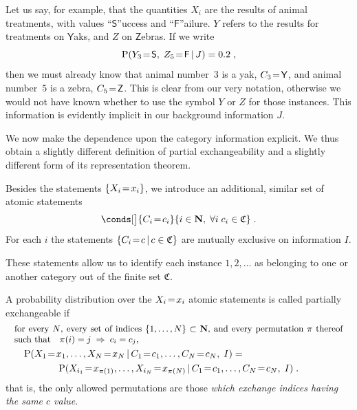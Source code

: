 \documentclass[\ifafour a4paper,12pt,\else a5paper,10pt,\fi%
onecolumn,oneside,article,%
british%
]{memoir}
\theoremstyle{remark}
\theoremstyle{innote}
\newcommand*{\NN}{\bm{\mathrm{N}}}
\DeclarePairedDelimiter\set{\{}{\}}
\newcommand*{\p}{\mathrm{P}}%
\renewcommand*{\|}[1][]{\nonscript\,#1\vert\nonscript\,\mathopen{}}
\newcommand*{\sect}{\S}%
\newcommand*{\mathbox}[2][.8]{\parbox[b]{#1\columnwidth}{#2}}
\renewcommand*{\=}{\TextOrMath\texteq\eq}
\newcommand*{\X}[1]{X_{#1}}
\newcommand*{\x}[1]{x_{#1}}
\newcommand*{\Y}[1]{Y_{#1}}
\newcommand*{\Z}[1]{Z_{#1}}
\newcommand*{\C}[1]{C_{#1}}
\newcommand*{\cc}[1]{c_{#1}}
\newcommand*{\sC}{\mathfrak{C}}
\newcommand*{\xs}{\textsf{S}}
\newcommand*{\xf}{\textsf{F}}
\newcommand*{\xY}{\textsf{Y}}
\newcommand*{\xZ}{\textsf{Z}}
\newcommand*{\zI}{J}
\begin{document}
Let us say, for example, that the quantities $\X{i}$ are the results of
animal treatments, with values \enquote{$\xs$}uccess and
\enquote{$\xf$}ailure. $Y$ refers to the results for treatments on
$\xY$aks, and $Z$ on $\xZ$ebras. If we write
$$\p(\Y{3}\=\xs,\;\Z{5}\=\xf \| \zI)=0.2\;,$$
then we must already know that animal number~$3$ is a yak, $\C{3}\=\xY$,
and animal number~$5$ is a zebra, $\C{5}\=\xZ$. This is clear from our very
notation, otherwise we would not have known whether to use the symbol $Y$
or $Z$ for those instances. This information is evidently implicit in our
background information $\zI$.

We now make the dependence upon the category information explicit. We thus
obtain a slightly different definition of partial exchangeability and a
slightly different form of its representation theorem.



Besides the statements $\set{\X{i}\=\x{i}}$, we introduce an additional,
similar set of atomic statements
\begin{equation}
  \label{eq:category_statements}
  \conds[\big]{\C{i}\=\cc{i}}{i \in \NN,\;
 \forall i\;\cc{i} \in \sC} \;.
\end{equation}
For each $i$ the statements $\set{\C{i}\=c \| c \in \sC}$ are mutually
exclusive on information $I$.

These statements allow us to identify each instance $1,2,\dotsc$ as
belonging to one or another category out of the finite set $\sC$.

A probability distribution over the $\X{i}\=\x{i}$ atomic statements
is called partially exchangeable if
\begin{multline}
  \label{eq:part_exchangeable}
  \mathbox[0.99]{\small for every $N$, every set of indices $\set{1, \dotsc,
      N}\subset \NN$, and every permutation $\pi$ thereof such that\quad
    $\pi(i)=j \mathrel{\;\Rightarrow\;} \cc{i}=\cc{j}$,}
  \\
\shoveleft{\p( \X{1}\=\x{1}, \dotsc, \X{N}\=\x{N}  \|
  \C{1}\=\cc{1}, \dotsc,\C{N}\=\cc{N},\;    I) ={}}\\
\p( \X{i_{1}}\=\x{\pi(1)}, \dotsc, \X{i_{N}}\=\x{\pi(N)}   \|
    \C{1}\=\cc{1}, \dotsc,\C{N}\=\cc{N},\;    I) \;.
\end{multline}
that is, the only allowed permutations are those \emph{which exchange
  indices having the same $c$ value}.

\end{document}
